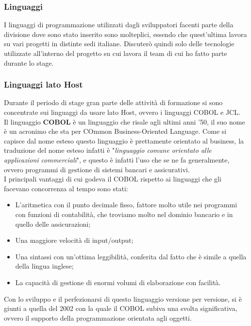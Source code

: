 	\subsubsection{Linguaggi}
	
	I linguaggi di programmazione utilizzati dagli sviluppatori facenti parte della divisione dove sono stato inserito sono molteplici, essendo che quest'ultima lavora su vari progetti in distinte sedi italiane. Discuterò quindi solo delle tecnologie utilizzate all'interno del progetto su cui lavora il team di cui ho fatto parte durante lo stage.
		
	\subsubsection{Linguaggi lato Host}
	Durante il periodo di stage gran parte delle attività di formazione si sono concentrate sui linguaggi da usare lato Host, ovvero i linguaggi COBOL e JCL.\\
	
	Il linguaggio \textbf{COBOL} è un linguaggio che risale agli ultimi anni '50, il suo nome è un acronimo che sta per COmmon Business-Oriented Language. Come si capisce dal nome esteso questo linguaggio è prettamente orientato al business, la traduzione del nome esteso infatti è "\textit{linguaggio comune orientato alle applicazioni commerciali}", e questo è infatti l'uso che se ne fa generalmente, ovvero programmi di gestione di sistemi bancari e assicurativi.\\

	I principali vantaggi di cui godeva il COBOL rispetto ai linguaggi che gli facevano concorrenza al tempo sono stati: 
	\begin{itemize}
		\item L'aritmetica con il punto decimale fisso, fattore molto utile nei programmi con funzioni di contabilità, che troviamo molto nel dominio bancario e in quello delle assicurazioni;
		\item Una maggiore velocità di input/output;
		\item Una sintassi con un'ottima leggibilità, conferita dal fatto che è simile a quella della lingua inglese;
		\item La capacità di gestione di enormi volumi di elaborazione con facilità.
	\end{itemize}		

	Con lo sviluppo e il perfezionarsi di questo linguaggio versione per versione, si è giunti a quella del 2002 con la quale il COBOL subiva una svolta significativa, ovvero il supporto della programmazione orientata agli oggetti.\\
	 
